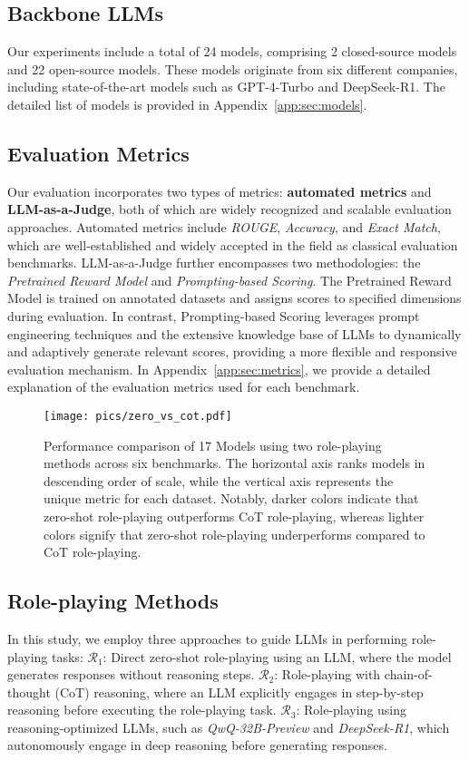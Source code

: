 \subsection{Backbone LLMs}
Our experiments include a total of 24 models, comprising 2 closed-source models and 22 open-source models. 
These models originate from six different companies, including state-of-the-art models such as GPT-4-Turbo and DeepSeek-R1. 
The detailed list of models is provided in Appendix~\ref{app:sec:models}.


\subsection{Evaluation Metrics}
Our evaluation incorporates two types of metrics: \textbf{automated metrics} and \textbf{LLM-as-a-Judge}, both of which are widely recognized and scalable evaluation approaches.
Automated metrics include \textit{ROUGE}, \textit{Accuracy}, and \textit{Exact Match}, which are well-established and widely accepted in the field as classical evaluation benchmarks.
LLM-as-a-Judge further encompasses two methodologies: the \textit{Pretrained Reward Model} and \textit{Prompting-based Scoring}. 
The Pretrained Reward Model is trained on annotated datasets and assigns scores to specified dimensions during evaluation. 
In contrast, Prompting-based Scoring leverages prompt engineering techniques and the extensive knowledge base of LLMs to dynamically and adaptively generate relevant scores, providing a more flexible and responsive evaluation mechanism.
In Appendix~\ref{app:sec:metrics}, we provide a detailed explanation of the evaluation metrics used for each benchmark.


\begin{figure*}[t]
    \centering
    \texttt{[image: pics/zero\_vs\_cot.pdf]}
    \caption{Performance comparison of 17 Models using two role-playing methods across six benchmarks. The horizontal axis ranks models in descending order of scale, while the vertical axis represents the unique metric for each dataset. Notably, darker colors indicate that zero-shot role-playing outperforms CoT role-playing, whereas lighter colors signify that zero-shot role-playing underperforms compared to CoT role-playing.}
    \label{fig:zero_vs_cot}
\end{figure*}


\subsection{Role-playing Methods}
In this study, we employ three approaches to guide LLMs in performing role-playing tasks:
\(\mathcal{R}_1\): Direct zero-shot role-playing using an LLM, where the model generates responses without reasoning steps.
\(\mathcal{R}_2\): Role-playing with chain-of-thought (CoT) reasoning, where an LLM explicitly engages in step-by-step reasoning before executing the role-playing task.
\(\mathcal{R}_3\): Role-playing using reasoning-optimized LLMs, such as \textit{QwQ-32B-Preview} and \textit{DeepSeek-R1}, which autonomously engage in deep reasoning before generating responses.
